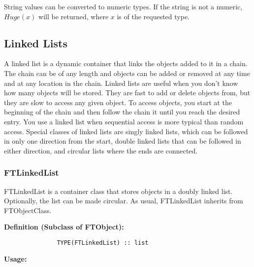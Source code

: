 \documentclass[9pt]{article}
\begin{document}
 String values can be converted to numeric types. If the string is
 not a numeric, $Huge(x)$ will be returned, where $x$ is of the
 requested type.

\subsection{Linked Lists}

A linked list is a dynamic container that links the objects added to it in a chain. The chain can be of 
any length and objects can be added or removed at any time and at any location in the chain. Linked lists
are useful when you don't know how many objects will be stored. They are fast to add or delete
objects from, but they are slow to access any given object. To access objects, you start at the beginning
of the chain and then follow the chain it until you reach the desired entry. You use a linked list when sequential
access is more typical than random access. Special classes of linked lists are singly linked lists, which
can be followed in only one direction from the start, double linked lists that can be followed in either direction,
and circular lists where the ends are connected.

\subsubsection{FTLinkedList}
 FTLinkedList is a container class that stores objects in a doubly linked list. Optionally, the list
 can be made circular. As usual, FTLinkedList inherits from FTObjectClass.
 
 
      {\bf Definition (Subclass of FTObject):}
	{\color{blue}\begin{verbatim}
               TYPE(FTLinkedList) :: list
	\end{verbatim}}
	
     { \bf Usage:}
     
\end{document}
